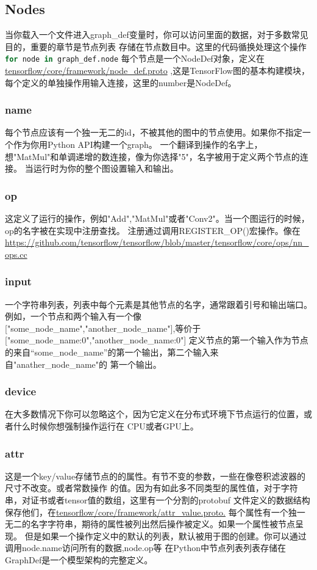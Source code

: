 \subsection{Nodes}
当你载入一个文件进入graph\_def变量时，你可以访问里面的数据，对于多数常见目的，重要的章节是节点列表
存储在节点数目中。这里的代码循换处理这个操作
\lstinline[language=Python]{for node in graph_def.node}
每个节点是一个NodeDef对象，定义在\href{https://github.com/tensorflow/tensorflow/blob/master/tensorflow/core/framework/node_def.proto}{tensorflow/core/framework/node_def.proto}
,这是TensorFlow图的基本构建模块，每个定义的单独操作用输入连接，这里的number是NodeDef。
\subsubsection{name}
每个节点应该有一个独一无二的id，不被其他的图中的节点使用。如果你不指定一个作为你用Python API构建一个graph。
一个翻译到操作的名字上，想"MatMul"和单调递增的数连接，像为你选择"5"，名字被用于定义两个节点的连接。
当运行时为你的整个图设置输入和输出。
\subsubsection{op}
这定义了运行的操作，例如"Add","MatMul"或者"Conv2"。当一个图运行的时候，op的名字被在实现中注册查找。
注册通过调用REGISTER\_OP()宏操作。像在\href{tensorflow/core/ops/nn\_ops.cc}{https://github.com/tensorflow/tensorflow/blob/master/tensorflow/core/ops/nn_ops.cc}
\subsubsection{input}
一个字符串列表，列表中每个元素是其他节点的名字，通常跟着引号和输出端口。例如，一个节点和两个输入有一个像
["some\_node\_name","another\_node\_name"],等价于["some\_node\_name:0","another\_node\_name:0"]
定义节点的第一个输入作为节点的来自“some\_node\_name”的第一个输出，第二个输入来自"anather\_node\_name"的
第一个输出。
\subsubsection{device}
在大多数情况下你可以忽略这个，因为它定义在分布式环境下节点运行的位置，或者什么时候你想强制操作运行在
CPU或者GPU上。
\subsubsection{attr}
这是一个key/value存储节点的的属性。有节不变的参数，一些在像卷积滤波器的尺寸不改变。或者常数操作
的值。因为有如此多不同类型的属性值，对于字符串，对证书或者tensor值的数组，这里有一个分割的protobuf
文件定义的数据结构保存他们，在\href{https://github.com/tensorflow/tensorflow/blob/master/tensorflow/core/framework/attr_value.proto}{tensorflow/core/framework/attr_value.proto.}
每个属性有一个独一无二的名字字符串，期待的属性被列出然后操作被定义。如果一个属性被节点呈现。
但是如果一个操作定义中的默认的列表，默认被用于图的创建。你可以通过调用node.name访问所有的数据,node.op等
在Python中节点列表列表存储在GraphDef是一个模型架构的完整定义。
